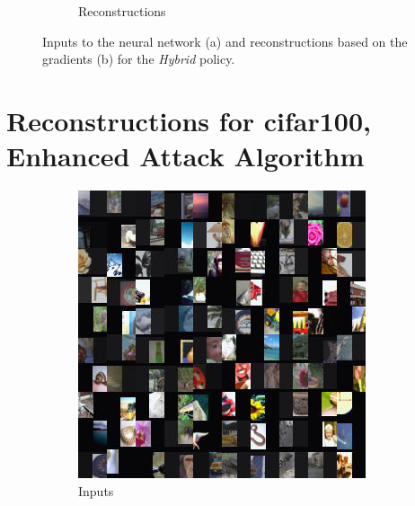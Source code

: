 \begin{figure}[hbt!]
\begin{subfigure}{.49\linewidth}
\caption{Reconstructions}%
\end{subfigure}%
\caption{Inputs to the neural network (a) and reconstructions based on the gradients (b) for the \textit{Hybrid} policy.}
    \label{fig:apprr4}
\end{figure}


\clearpage
\section{Reconstructions for cifar100, Enhanced Attack Algorithm}\label{apx:reaa}



\begin{figure}[hbt!]
\begin{subfigure}{.49\linewidth}\centering
\includegraphics[width=\textwidth]{grids/data_cifar100_arch_ResNet20-4_epoch_200_optim_inversed_mode_aug_auglist_3-1-7_rlabel_False_reaugment_translate_clipped1_ORIGINALS.png}
\caption{Inputs}%
\end{subfigure}%
\hfill
\begin{subfigure}{.49\linewidth}\centering

\end{subfigure}
\end{figure}
